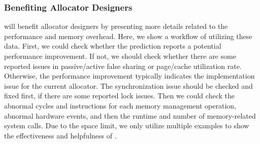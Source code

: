 \subsubsection{Benefiting Allocator Designers}
\label{sec: benifitdesigners}
\MP{} will benefit allocator designers by presenting more details related to the performance and memory overhead. Here, we show a workflow of utilizing these data. First, we could check whether the prediction reports a potential performance improvement. If not, we should check whether there are some reported issues in passive/active false sharing or page/cache utilization rate. Otherwise, the performance improvement typically indicates the implementation issue for the current allocator. The synchronization issue should be checked and fixed first, if there are some reported lock issues. Then we could check the abnormal cycles and instructions for each memory management operation, abnormal hardware events, and then the runtime and number of memory-related system calls. Due to the space limit, we only utilize multiple examples to show the effectiveness and helpfulness of \MP{}. 







 







